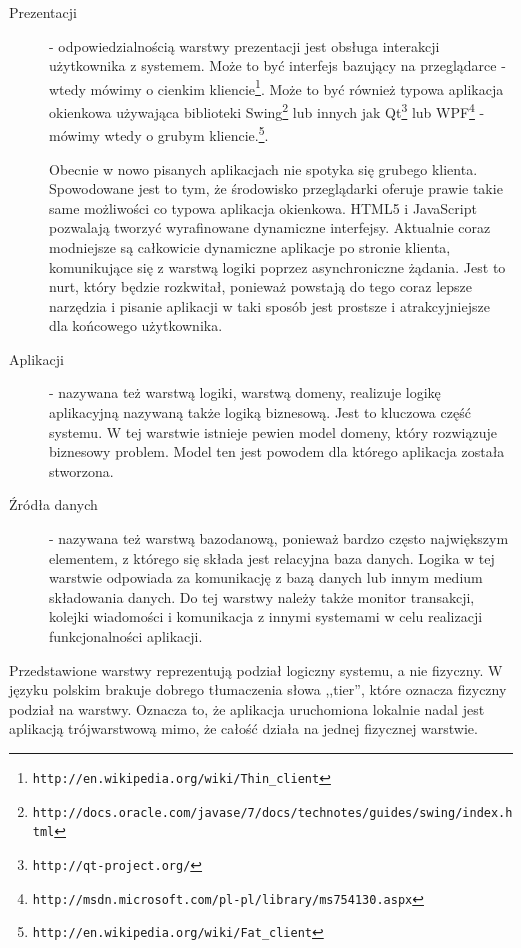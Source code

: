 \documentclass[a4paper,onecolumn,oneside,11pt,wide,floatssmall]{mwrep}
\def\url#1{{ \tt #1}}
\theoremstyle{definition}
\theoremstyle{plain}%
\theoremstyle{remark}
\begin{document}
\begin{description}
  \item[Prezentacji] - odpowiedzialnością warstwy prezentacji jest obsługa interakcji użytkownika z systemem. Może to 
  być interfejs bazujący na przeglądarce - wtedy mówimy o cienkim kliencie\footnote{\url{http://en.wikipedia.org/wiki/Thin\_client}}.
   Może to być również typowa aplikacja okienkowa używająca biblioteki 
   Swing\footnote{\url{http://docs.oracle.com/javase/7/docs/technotes/guides/swing/index.html}} 
   lub innych jak Qt\footnote{\url{http://qt-project.org/}} lub 
   WPF\footnote{\url{http://msdn.microsoft.com/pl-pl/library/ms754130.aspx}} - mówimy wtedy o
    grubym kliencie.\footnote{\url{http://en.wikipedia.org/wiki/Fat\_client}}. 

    Obecnie w nowo pisanych aplikacjach nie spotyka się grubego klienta. Spowodowane jest to tym, że środowisko 
    przeglądarki oferuje prawie takie same możliwości co typowa aplikacja okienkowa. HTML5 i JavaScript pozwalają 
    tworzyć wyrafinowane dynamiczne interfejsy. Aktualnie coraz modniejsze są całkowicie dynamiczne aplikacje po 
    stronie klienta, komunikujące się z warstwą logiki poprzez asynchroniczne żądania. Jest to nurt, który będzie 
    rozkwitał, ponieważ powstają do tego coraz lepsze narzędzia i pisanie aplikacji w taki sposób jest prostsze i 
    atrakcyjniejsze dla końcowego użytkownika. 
  
  \item[Aplikacji] - nazywana też warstwą logiki, warstwą domeny, realizuje logikę aplikacyjną nazywaną także logiką 
  biznesową. Jest to kluczowa część systemu. W tej warstwie istnieje pewien model domeny, który rozwiązuje biznesowy 
  problem. Model ten jest powodem dla którego aplikacja została stworzona. 
  
  \item[Źródła danych] - nazywana też warstwą bazodanową, ponieważ bardzo często największym elementem, z którego się 
  składa jest relacyjna baza danych. Logika w tej warstwie odpowiada za komunikację z bazą danych lub innym medium 
  składowania danych. Do tej warstwy należy także monitor transakcji, kolejki wiadomości i komunikacja z innymi 
  systemami w celu realizacji funkcjonalności aplikacji. 
\end{description}

Przedstawione warstwy reprezentują podział logiczny systemu, a nie fizyczny. W języku polskim brakuje dobrego 
tłumaczenia słowa ,,tier'', które oznacza fizyczny podział na warstwy. Oznacza to, że aplikacja uruchomiona lokalnie 
nadal jest aplikacją trójwarstwową mimo, że całość działa na jednej fizycznej warstwie. 
\end{document}

